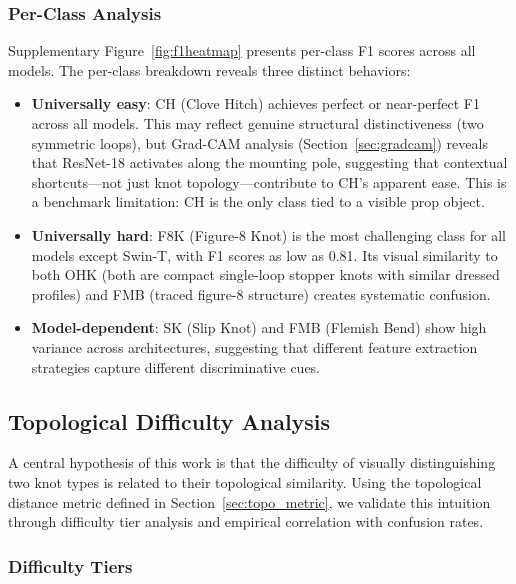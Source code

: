 \documentclass[preprint,review,12pt]{elsarticle}
\begin{document}
\subsubsection{Per-Class Analysis}

Supplementary Figure~\ref{fig:f1heatmap} presents per-class F1 scores across all models. The per-class breakdown reveals three distinct behaviors:

\begin{itemize}
    \item \textbf{Universally easy}: CH (Clove Hitch) achieves perfect or near-perfect F1 across all models. This may reflect genuine structural distinctiveness (two symmetric loops), but Grad-CAM analysis (Section~\ref{sec:gradcam}) reveals that ResNet-18 activates along the mounting pole, suggesting that contextual shortcuts---not just knot topology---contribute to CH's apparent ease. This is a benchmark limitation: CH is the only class tied to a visible prop object.
    \item \textbf{Universally hard}: F8K (Figure-8 Knot) is the most challenging class for all models except Swin-T, with F1 scores as low as 0.81. Its visual similarity to both OHK (both are compact single-loop stopper knots with similar dressed profiles) and FMB (traced figure-8 structure) creates systematic confusion.
    \item \textbf{Model-dependent}: SK (Slip Knot) and FMB (Flemish Bend) show high variance across architectures, suggesting that different feature extraction strategies capture different discriminative cues.
\end{itemize}



\subsection{Topological Difficulty Analysis}\label{sec:topo_difficulty}

A central hypothesis of this work is that the difficulty of visually distinguishing two knot types is related to their topological similarity. Using the topological distance metric defined in Section~\ref{sec:topo_metric}, we validate this intuition through difficulty tier analysis and empirical correlation with confusion rates.

\subsubsection{Difficulty Tiers}
\end{document}
